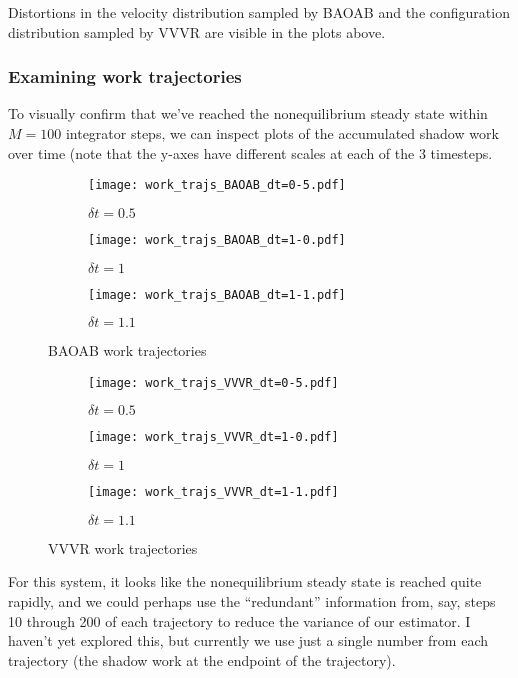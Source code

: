 \documentclass[11pt]{article}
\begin{document}
Distortions in the velocity distribution sampled by BAOAB and the configuration distribution sampled by VVVR are visible in the plots above.


\subsubsection{Examining work trajectories}
To visually confirm that we've reached the nonequilibrium steady state within $M=100$ integrator steps, we can inspect plots of the accumulated shadow work over time (note that the y-axes have different scales at each of the 3 timesteps.
\begin{figure}[h] %
    \centering
    \begin{subfigure}[b]{0.3\textwidth}
        \texttt{[image: work\_trajs\_BAOAB\_dt=0-5.pdf]}
        \caption{$\delta t = 0.5$}
    \end{subfigure}
    \begin{subfigure}[b]{0.3\textwidth}
        \texttt{[image: work\_trajs\_BAOAB\_dt=1-0.pdf]}
        \caption{$\delta t = 1$}
    \end{subfigure}
    \begin{subfigure}[b]{0.3\textwidth}
        \texttt{[image: work\_trajs\_BAOAB\_dt=1-1.pdf]}
        \caption{$\delta t = 1.1$}
    \end{subfigure}
    \caption{BAOAB work trajectories}
\end{figure}

\begin{figure}[h] %
    \centering
    \begin{subfigure}[b]{0.3\textwidth}
        \texttt{[image: work\_trajs\_VVVR\_dt=0-5.pdf]}
        \caption{$\delta t = 0.5$}
    \end{subfigure}
    \begin{subfigure}[b]{0.3\textwidth}
        \texttt{[image: work\_trajs\_VVVR\_dt=1-0.pdf]}
        \caption{$\delta t = 1$}
    \end{subfigure}
    \begin{subfigure}[b]{0.3\textwidth}
        \texttt{[image: work\_trajs\_VVVR\_dt=1-1.pdf]}
        \caption{$\delta t = 1.1$}
    \end{subfigure}
    \caption{VVVR work trajectories}
\end{figure}

For this system, it looks like the nonequilibrium steady state is reached quite rapidly, and we could perhaps use the ``redundant'' information from, say, steps 10 through 200 of each trajectory to reduce the variance of our estimator.
I haven't yet explored this, but currently we use just a single number from each trajectory (the shadow work at the endpoint of the trajectory).
\end{document}
